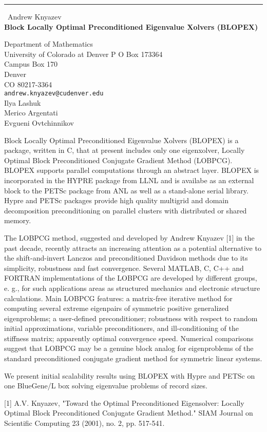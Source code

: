 \documentclass{report}
\begin{document}
\begin{center}
\rule{6in}{1pt} \
{\large Andrew Knyazev \\
{\bf Block Locally Optimal Preconditioned Eigenvalue Xolvers (BLOPEX)}}

Department of Mathematics \\ University of Colorado at Denver P O Box 173364 \\ Campus Box 170 \\ Denver \\ CO 80217-3364
\\
{\tt andrew.knyazev@cudenver.edu}\\
Ilya Lashuk\\
Merico Argentati\\
	Evgueni Ovtchinnikov\end{center}

Block Locally Optimal Preconditioned Eigenvalue Xolvers (BLOPEX) is a
package, written in C, that at present includes only one eigenxolver,
Locally Optimal Block Preconditioned Conjugate Gradient Method (LOBPCG).
BLOPEX supports parallel computations through an abstract layer. BLOPEX
is incorporated in the HYPRE package from LLNL and is availabe as an
external block to the PETSc package from ANL as well as a stand-alone
serial library. Hypre and PETSc packages provide high quality multigrid
and domain decomposition preconditioning on parallel clusters with
distributed or shared memory.

The LOBPCG method, suggested and developed by Andrew Knyazev [1] in the
past decade, recently attracts an increasing attention as a potential
alternative to the shift-and-invert Lanczos and preconditioned Davidson
methods due to its simplicity, robustness and fast convergence. Several
MATLAB, C, C++ and FORTRAN implementations of the LOBPCG are developed by
different groups, e. g., for such applications areas as structured
mechanics and electronic structure calculations.
Main LOBPCG features: a matrix-free iterative method for computing
several extreme eigenpairs of symmetric positive generalized
eigenproblems; a user-defined preconditioner; robustness with respect to
random initial approximations, variable preconditioners, and
ill-conditioning of the stiffness matrix; apparently optimal convergence
speed. Numerical comparisons suggest that LOBPCG may be a genuine block
analog for eigenproblems of the standard preconditioned conjugate
gradient method for symmetric linear systems.

We present initial scalability results using BLOPEX with Hypre and PETSc
on one BlueGene/L box solving eigenvalue problems of record sizes.

[1] A.V. Knyazev, "Toward the Optimal Preconditioned Eigensolver: Locally
Optimal Block Preconditioned Conjugate Gradient Method." SIAM Journal on
Scientific Computing 23 (2001), no. 2, pp. 517-541.
\end{document}
